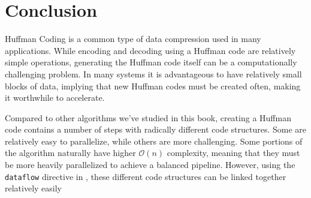 \section{Conclusion}

Huffman Coding is a common type of data compression used in many applications.  While encoding and decoding using a Huffman code are relatively simple operations, generating the Huffman code itself can be a computationally challenging problem.  In many systems it is advantageous to have relatively small blocks of data, implying that new Huffman codes must be created often, making it worthwhile to accelerate.

Compared to other algorithms we've studied in this book, creating a Huffman code contains a number of steps with radically different code structures.  Some are relatively easy to parallelize, while others are more challenging.  Some portions of the algorithm naturally have higher $\mathcal{O}(n)$ complexity, meaning that they must be more heavily parallelized to achieve a balanced pipeline.  However, using the \lstinline{dataflow} directive in \VHLS, these different code structures can be linked together relatively easily
